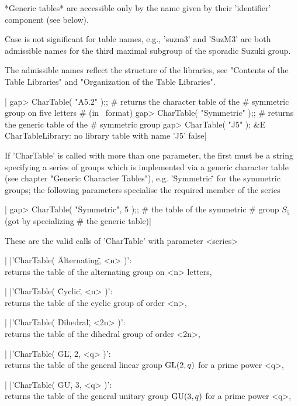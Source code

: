 *Generic tables* are accessible  only  by the name  given by their
'identifier' component (see below).

Case  is not significant for table names,  e.g., 'suzm3' and  'SuzM3' are
both  admissible  names  for  the third maximal subgroup of the  sporadic
Suzuki group.

The  admissible  names  reflect  the  structure  of  the  libraries,  see
"Contents  of  the  Table  Libraries"  and  "Organization  of  the  Table
Libraries".

|    gap> CharTable( "A5.2" );;  # returns the character table of the
                                # symmetric group on five letters
                                # (in \ATLAS\ format)
    gap> CharTable( "Symmetric" );;  # returns the generic table of the
                                     # symmetric group
    gap> CharTable( "J5" );
    &E CharTableLibrary: no library table with name 'J5'
    false|

If 'CharTable' is called with more than one  parameter, the first must be
a string specifying a series of groups which is implemented via a generic
character  table   (see  chapter   "Generic  Character   Tables"),   e.g.
'\"Symmetric\"'  for  the  symmetric  groups;  the  following  parameters
specialise the required member of the series\:

|    gap> CharTable( "Symmetric", 5 );; # the table of the symmetric
                                       # group $S_5$ (got by specializing
                                       # the generic table)|

These are the valid calls of 'CharTable' with parameter <series>\:

|    |'CharTable( \"Alternating\", <n> )':\\
    returns the table of the alternating group on <n> letters,

|    |'CharTable( \"Cyclic\", <n> )':\\
    returns the table of the cyclic group of order <n>,

|    |'CharTable( \"Dihedral\", <2n> )':\\
    returns the table of the dihedral group of order <2n>,

|    |'CharTable( \"GL\", 2, <q> )':\\
    returns the table of the general linear group $\mbox{\rm GL}(2,q)$
    for a prime power <q>,

|    |'CharTable( \"GU\", 3, <q> )':\\
    returns the table of the general unitary group $\mbox{\rm GU}(3,q)$
    for a prime power <q>,

